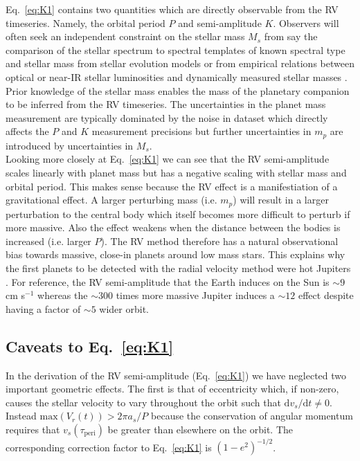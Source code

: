Eq.~\ref{eq:K1} contains two quantities which are directly observable from the RV timeseries.
Namely, the orbital period $P$ and semi-amplitude $K$. Observers will often seek an independent
constraint on the stellar mass $M_s$ from say the comparison of the stellar spectrum to
spectral templates of known spectral type and stellar mass from stellar evolution models
\citep[e.g.][]{muirhead12} or from
empirical relations between optical or near-IR stellar luminosities and dynamically
measured stellar masses \citep[e.g.][]{benedict16,mann19}. Prior knowledge of the
stellar mass enables the mass of the planetary companion to be inferred from the RV timeseries.
The uncertainties in the planet mass 
measurement are typically dominated by the noise in dataset which directly affects the
$P$ and $K$ measurement precisions but further uncertainties in $m_p$ are introduced by
uncertainties in $M_s$. \\

Looking more closely at Eq.~\ref{eq:K1} we can see that the RV semi-amplitude scales 
linearly with planet mass but has a negative scaling with stellar mass and orbital 
period. This makes sense because the RV effect is a manifestiation of a gravitational effect.
A larger perturbing mass (i.e. $m_p$) will result in a larger perturbation to the 
central body which itself becomes more difficult to perturb if more massive. Also the 
effect weakens when the distance between the bodies is increased (i.e. larger $P$). The 
RV method therefore has a natural observational bias towards massive, 
close-in planets around low mass stars. This explains why the first planets to be 
detected with the radial velocity method were hot Jupiters 
\citep[e.g.][]{mayor95}. For reference, the RV semi-amplitude that the Earth 
induces on the Sun is $\sim 9$ cm s$^{-1}$ whereas the $\sim 300$ times more massive Jupiter
induces a $\sim 12$ \mps{} effect despite having a factor of $\sim 5$ wider orbit.

\subsection{Caveats to Eq.~\ref{eq:K1}}
In the derivation of the RV semi-amplitude (Eq.~\ref{eq:K1}) we have neglected two 
important geometric effects. The first is that of eccentricity which, if non-zero, 
causes the stellar velocity to vary throughout the orbit such that
$\text{d}v_s/\text{d}t \ne 0$. Instead $\mathrm{max}(V_r(t)) > 2\pi a_s/P$ 
because the conservation of angular momentum requires that $v_s(\tau_{\text{peri}})$ 
be greater than elsewhere on the orbit. The corresponding correction 
factor to Eq.~\ref{eq:K1} is $(1-e^2)^{-1/2}$. \\


